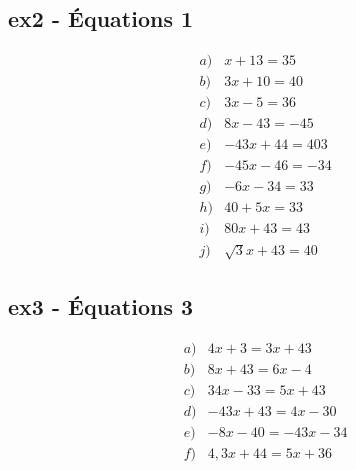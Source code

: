\documentclass[12pt]{article}
\begin{document}
  \begin{multicols}{2}
    \subsection*{ex2 - Équations 1}

    \begin{eqnarray*}
      & a) & x + 13 = 35  \\
      & b) & 3x + 10 = 40  \\
      & c) & 3x - 5  = 36  \\
      & d) & 8x - 43 = -45 \\
      & e) & -43x + 44 = 403 \\
      & f) & -45x - 46 = -34 \\
      & g) & -6x - 34 = 33  \\
      & h) & 40 + 5x = 33  \\
      & i) & 80x + 43 = 43 \\
      & j) & \sqrt{3} x + 43 = 40 
    \end{eqnarray*}


    \subsection*{ex3 - Équations 3}

    \begin{eqnarray*}
      & a) & 4x + 3 = 3x + 43    \\
      & b) & 8x + 43 = 6x - 4     \\
      & c) & 34x - 33 = 5x + 43    \\
      & d) & -43x + 43 = 4x -30     \\
      & e) & -8x - 40 = -43x - 34  \\
      & f) & 4,3x + 44 = 5x + 36    \\
    \end{eqnarray*}
  \end{multicols}
\end{document}
